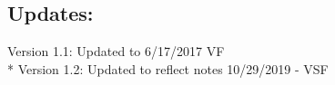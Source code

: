 \documentclass[a4paper,12pt,twoside]{book}
\begin{document}
\begin{enumerate}
	
\end{enumerate}

 \subsection*{Updates:}
Version 1.1: Updated to 6/17/2017 VF  \\*
Version 1.2: Updated to reflect notes 10/29/2019 - VSF
\end{document}
